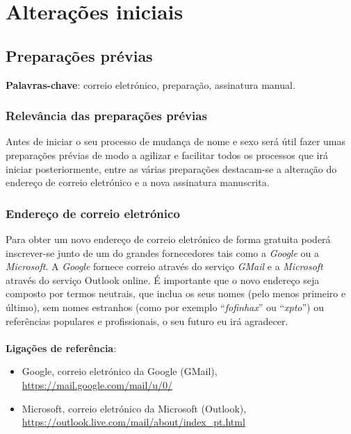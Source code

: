 
\newpage

\section{Alterações iniciais}

\subsection{Preparações prévias}

\textbf{Palavras-chave}: correio eletrónico, preparação, assinatura manual.

\subsubsection{Relevância das preparações prévias}

Antes de iniciar o seu processo de mudança de nome e sexo será útil
fazer umas preparações prévias de modo a agilizar e facilitar todos os
processos que irá iniciar posteriormente, entre as várias preparações
destacam-se a alteração do endereço de correio eletrónico e a nova
assinatura manuscrita.

\subsubsection{Endereço de correio eletrónico}

Para obter um novo endereço de correio eletrónico de forma gratuita
poderá inscrever-se junto de um do grandes fornecedores tais como a
\emph{Google} ou a \emph{Microsoft}. A \emph{Google} fornece correio
através do serviço \emph{GMail} e a \emph{Microsoft} através do serviço
Outlook online. É importante que o novo endereço seja composto por
termos neutrais, que inclua os seus nomes (pelo menos primeiro e
último), sem nomes estranhos (como por exemplo ``\emph{fofinhax}'' ou
``\emph{xpto}'') ou referências populares e profissionais, o seu futuro
eu irá agradecer. \\
\\
\textbf{Ligações de referência}:
\begin{itemize}
	\item Google, correio eletrónico da Google (GMail), \url{https://mail.google.com/mail/u/0/}
	\item Microsoft, correio eletrónico da Microsoft (Outlook), \url{https://outlook.live.com/mail/about/index\_pt.html}
\end{itemize}

